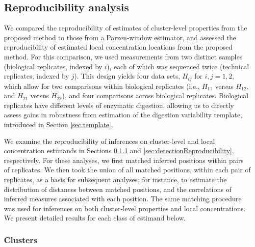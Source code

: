 \subsection{Reproducibility analysis}
\label{sec:reproducibility}

We compared the reproducibility of estimates of cluster-level properties from the proposed method to those from a Parzen-window estimator, and assessed the reproducibility of estimated local concentration locations from the proposed method. 
%
For this comparison, we used measurements from two distinct samples (biological replicates, indexed by $i$), each of which was sequenced twice (technical replicates, indexed by $j$).
This design yields four data sets, $H_{ij}$ for $i,j=1,2$, which allow for two comparisons within biological replicates (i.e., $H_{11}$ versus $H_{12}$, and $H_{21}$ versus $H_{22}$), and  four comparisons across biological replicates.
Biological replicates have different levels of enzymatic digestion, allowing us to directly assess gains in robustness from estimation of the digestion variability template, introduced in Section \ref{sec:template}.
	
We examine the reproducibility of inferences on cluster-level and local concentration estimands in Sections \ref{sec:clusterReproducibility} and \ref{sec:detectionReproducibility}, respectively.
For these analyses, we first matched inferred positions within pairs of replicates.
We then took the union of all matched positions, within each pair of replicates, as a basis for subsequent analyses; for instance, to estimate the distribution of distances between matched positions, and the correlations of inferred measures associated with each position.
%
The same matching procedure was used for inferences on both cluster-level properties and local concentrations.
%
We present detailed results for each class of estimand below.

\subsubsection{Clusters}
\label{sec:clusterReproducibility}

